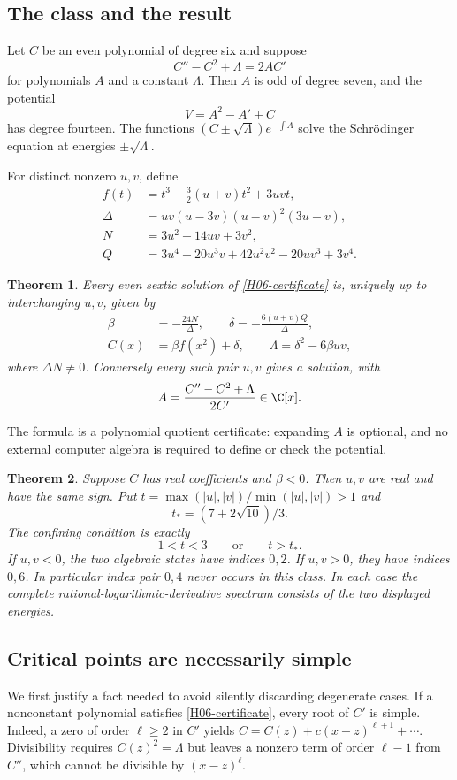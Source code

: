 \documentclass[11pt,a4paper]{article}
\newtheorem{theorem}{Theorem}[section]
\theoremstyle{definition}\newtheorem{definition}[theorem]{Definition}
\theoremstyle{remark}\newtheorem{remark}[theorem]{Remark}
\numberwithin{equation}{section}
\begin{document}
\subsection{The class and the result}\label{H06-sec-1}
Let $C$ be an even polynomial of degree six and suppose
\begin{equation}\label{H06-certificate}
C''-C^2+\Lambda=2AC'
\end{equation}
for polynomials $A$ and a constant $\Lambda$. Then $A$ is odd of degree seven, and the potential
\[V=A^2-A'+C\]
has degree fourteen. The functions $(C\pm\sqrt\Lambda)e^{-\int A}$ solve the Schr\"odinger equation at energies $\pm\sqrt\Lambda$.

For distinct nonzero $u,v$, define
\begin{align*}
f(t)&=t^3-\frac32(u+v)t^2+3uvt,\\
\Delta&=uv(u-3v)(u-v)^2(3u-v),\\
N&=3u^2-14uv+3v^2,\\
Q&=3u^4-20u^3v+42u^2v^2-20uv^3+3v^4.
\end{align*}
\begin{theorem}\label{H06-classification}
Every even sextic solution of \eqref{H06-certificate} is, uniquely up to interchanging $u,v$, given by
\begin{align}\label{H06-param}
\beta&=-\frac{24N}{\Delta},\qquad
\delta=-\frac{6(u+v)Q}{\Delta},\\
C(x)&=\beta f(x^2)+\delta,\qquad
\Lambda=\delta^2-6\beta uv,\nonumber
\end{align}
where $\Delta N\ne0$. Conversely every such pair $u,v$ gives a solution, with
\[A=\frac{C''-C^2+\Lambda}{2C'}\in\C[x].\]
\end{theorem}
The formula is a polynomial quotient certificate: expanding $A$ is optional, and no external computer algebra is required to define or check the potential.
\begin{theorem}\label{H06-physical}
Suppose $C$ has real coefficients and $\beta<0$. Then $u,v$ are real and have the same sign. Put $t=\max(|u|,|v|)/\min(|u|,|v|)>1$ and
\[t_*=(7+2\sqrt{10})/3.\]
The confining condition is exactly
\[1<t<3\qquad\text{or}\qquad t>t_*.
\]
If $u,v<0$, the two algebraic states have indices $0,2$. If $u,v>0$, they have indices $0,6$. In particular index pair $0,4$ never occurs in this class. In each case the complete rational-logarithmic-derivative spectrum consists of the two displayed energies.
\end{theorem}
\subsection{Critical points are necessarily simple}\label{H06-sec-2}
We first justify a fact needed to avoid silently discarding degenerate cases. If a nonconstant polynomial satisfies \eqref{H06-certificate}, every root of $C'$ is simple. Indeed, a zero of order $\ell\ge2$ in $C'$ yields $C=C(z)+c(x-z)^{\ell+1}+\cdots$. Divisibility requires $C(z)^2=\Lambda$ but leaves a nonzero term of order $\ell-1$ from $C''$, which cannot be divisible by $(x-z)^\ell$.
\end{document}
